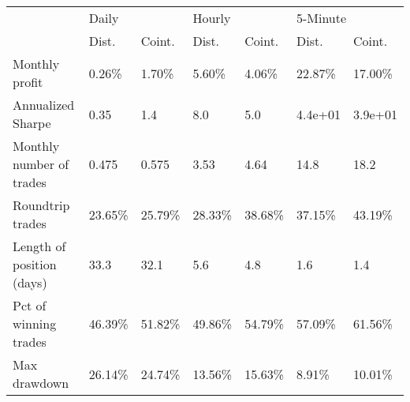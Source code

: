 \begin{tabular}{lllllll}
\toprule
{} & \multicolumn{2}{l}{Daily} & \multicolumn{2}{l}{Hourly} & \multicolumn{2}{l}{5-Minute} \\
{} &    Dist. &   Coint. &    Dist. &   Coint. &    Dist. &   Coint. \\
\midrule
Monthly profit            &   0.26\% &   1.70\% &   5.60\% &   4.06\% &  22.87\% &  17.00\% \\
Annualized Sharpe         &     0.35 &      1.4 &      8.0 &      5.0 &  4.4e+01 &  3.9e+01 \\
Monthly number of trades  &    0.475 &    0.575 &     3.53 &     4.64 &     14.8 &     18.2 \\
Roundtrip trades          &  23.65\% &  25.79\% &  28.33\% &  38.68\% &  37.15\% &  43.19\% \\
Length of position (days) &     33.3 &     32.1 &      5.6 &      4.8 &      1.6 &      1.4 \\
Pct of winning trades     &  46.39\% &  51.82\% &  49.86\% &  54.79\% &  57.09\% &  61.56\% \\
Max drawdown              &  26.14\% &  24.74\% &  13.56\% &  15.63\% &   8.91\% &  10.01\% \\
\bottomrule
\end{tabular}
